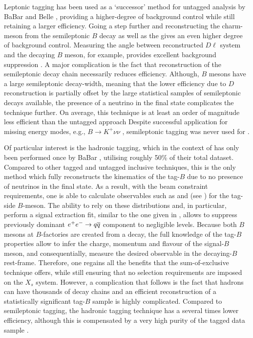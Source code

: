 Leptonic tagging has been used as a `successor' method for \BtoXsgamma untagged analysis by BaBar and Belle \cite{Belle:2009nth,BaBar:2012fqh,Belle:2016ufb}, providing a higher-degree of background control while still retaining a larger efficiency.
Going a step further and reconstructing the charm-meson from the semileptonic $B$ decay as well as the gives an even higher degree of background control.
Measuring the angle between reconstructed $D\ell$ system and the decaying $B$ meson, for example, provides excellent background suppression \cite{BaBar:2014omp}.
A major complication is the fact that reconstruction of the semileptonic decay chain necessarily reduces efficiency.
Although, $B$ mesons have a large semileptonic decay-width, meaning that the lower efficiency due to $D$ reconstruction is partially offset by the large statistical samples of semileptonic decays available,
the presence of a neutrino in the final state complicates the technique further.
On average, this technique is at least an order of magnitude less efficient than the untagged approach \cite{Belle-II:2018jsg}
Despite successful application for missing energy modes, e.g., $B\rightarrow K^+\nu\nu$ \cite{BaBar:2009qvi}, semileptonic tagging was never used for \BtoXsgamma.


Of particular interest is the hadronic tagging, which in the context of \BtoXsgamma has only been performed once by BaBar \cite{BaBar:2007yhb}, utilising roughly 50\% of their total dataset.
Compared to other tagged and untagged inclusive techniques, this is the only method which fully reconstructs the kinematics of the tag-$B$ due to no presence of neutrinos in the final state.
As a result, with the beam constraint requirements, one is able to calculate observables such as \Mbc and \DeltaE (see ) for the tag-side $B$-meson.
The ability to rely on these distributions and, in particular, perform a signal extraction fit, similar to the one given in , allows to suppress previously dominant $e^+e^-\rightarrow q\overline q$ component to negligible levels.
Because both $B$ mesons at $B$-factories are created from a \FourS decay, the full knowledge of the tag-$B$ properties allow to infer the charge, momentum and flavour of the signal-$B$ meson, and consequentially, measure the desired observable in the decaying-$B$ rest-frame.
Therefore, one regains all the benefits that the sum-of-exclusive technique offers, while still ensuring that no selection requirements are imposed on the $X_s$ system.
However, a complication that follows is the fact that hadrons can have thousands of decay chains and an efficient reconstruction of a statistically significant tag-$B$ sample is highly complicated.
Compared to semileptonic tagging, the hadronic tagging technique has a several times lower efficiency, although this is compensated by a very high purity of the tagged data sample \cite{Belle-II:2018jsg}.

